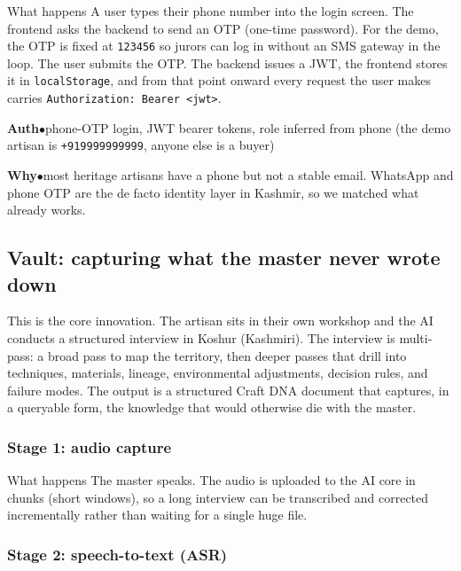 \documentclass[11pt,a4paper]{article}
\newcommand{\stack}[2]{%
  \par\noindent\textbf{\color{walnut}#1}\hspace{0.5em}\textcolor{rouge}{$\bullet$}\hspace{0.5em}\textcolor{faded}{#2}\par
}
\begin{document}
\begin{stage}{What happens}
A user types their phone number into the login screen. The frontend
asks the backend to send an OTP (one-time password). For the demo, the
OTP is fixed at \texttt{123456} so jurors can log in without an SMS
gateway in the loop. The user submits the OTP. The backend issues a
JWT, the frontend stores it in \texttt{localStorage}, and from that
point onward every request the user makes carries
\texttt{Authorization: Bearer <jwt>}.
\end{stage}

\stack{Auth}{phone-OTP login, JWT bearer tokens, role inferred from
phone (the demo artisan is \texttt{+919999999999}, anyone else is a
buyer)}
\stack{Why}{most heritage artisans have a phone but not a stable email.
WhatsApp and phone OTP are the de facto identity layer in Kashmir, so
we matched what already works.}

\subsection{Vault: capturing what the master never wrote down}

This is the core innovation. The artisan sits in their own workshop and
the AI conducts a structured interview in Koshur (Kashmiri). The
interview is multi-pass: a broad pass to map the territory, then deeper
passes that drill into techniques, materials, lineage, environmental
adjustments, decision rules, and failure modes. The output is a
structured Craft DNA document that captures, in a queryable form, the
knowledge that would otherwise die with the master.

\subsubsection*{Stage 1: audio capture}

\begin{stage}{What happens}
The master speaks. The audio is uploaded to the AI core in chunks
(short windows), so a long interview can be transcribed and corrected
incrementally rather than waiting for a single huge file.
\end{stage}

\subsubsection*{Stage 2: speech-to-text (ASR)}
\end{document}
